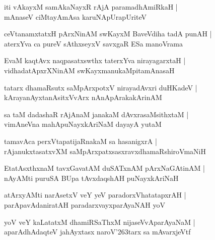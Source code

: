 \documentclass[twoside,12pt,openright]{book}
\def\S{\char'263}
\newcounter{shloka}[chapter]
\begin{document}
\begin{shloka}%
iti vAkayxM samAkaNayxR rAjA paramadhAmiRkaH |\\
mAnaseV ciMtayAmAsa karuNApUrapUriteV 
\end{shloka}

\begin{shloka}%
ceVtanamxtatxH pArxNinAM swKayxM BaveVdiha tadA punAH |\\
aterxYva ca pureV sAthxseyxV savxgaR ESa manoVrama
\end{shloka}

\begin{shloka}%
EvaM kaqtAvx naqpasatxswthx taterxYva nirayagarxtaH |\\
vidhadatApxrXNinAM swKayxmanukaMpitamAnasaH
\end{shloka}

\begin{shloka}%
tatarx dhamaRsutx saMpArxpotxV nirayadAvxri duHKadeV |\\
kArayanAyxtanAsitxVvArx nAnApArakakArinAM 
\end{shloka}

\begin{shloka}%
sa taM dadashaR rAjAnaM janakaM dAvxrasaMsithxtaM |\\
vimAneVna mahApuNayxkAriNaM dayayA yutaM 
\end{shloka}

\begin{shloka}%
tamavAca perxVtapatijaRnakaM sa hasanigxrA |\\
rAjanukxtasatxvXM saMpArxpatxsasxravxdhamaRshiroVmaNiH
\end{shloka}

\begin{shloka}%
EtatAsxthxnaM tavxGavatAM duSATxnAM pArxNaGAtinAM |\\
nAyAMti puruSA BUpa tAvxdaqshAH puNayxkAriNaH
\end{shloka}

\begin{shloka}%
atArxyAMti narAsetxV veY yeV paradorxVhatatapxrAH |\\
parApavAdaniratAH paradarxvayxparAyaNAH yoV 
\end{shloka}

\begin{shloka}%
yoV veY kaLatatxM dhamiRSaThxM nijaseVvAparAyaNaM |\\
aparAdhAdaqteV jahAyxtasx naroV\S tarx sa mAvarxjeVtf 
\end{shloka}
\end{document}
